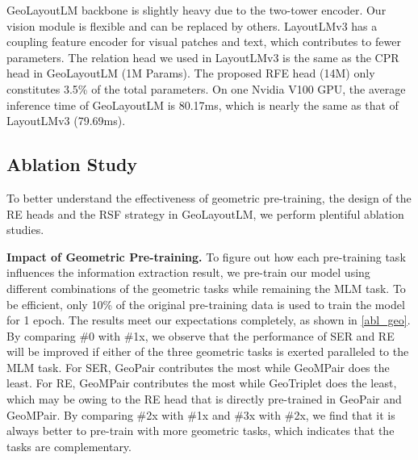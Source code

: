 \documentclass[10pt,twocolumn,letterpaper]{article}
\begin{document}
GeoLayoutLM backbone is slightly heavy due to the two-tower encoder.
Our vision module is flexible and can be replaced by others.
LayoutLMv3 has a coupling feature encoder for visual patches and text, which contributes to fewer parameters.
The relation head we used in LayoutLMv3 is the same as the CPR head in GeoLayoutLM (1M Params).
The proposed RFE head (14M) only constitutes 3.5\% of the total parameters.
On one Nvidia V100 GPU, the average inference time of GeoLayoutLM is 80.17ms, which is nearly the same as that of LayoutLMv3 (79.69ms).

\subsection{Ablation Study}
To better understand the effectiveness of geometric pre-training, the design of the RE heads and the RSF strategy in GeoLayoutLM, we perform plentiful ablation studies.


\noindent \textbf{Impact of Geometric Pre-training.}
To figure out how each pre-training task influences the information extraction result, we pre-train our model using different combinations of the geometric tasks while remaining the MLM task. To be efficient, only 10\% of the original pre-training data is used to train the model for 1 epoch.
The results meet our expectations completely, as shown in \cref{abl_geo}. By comparing \#0 with \#1x, we observe that the performance of SER and RE will be improved if either of the three geometric tasks is exerted paralleled to the MLM task. For SER, GeoPair contributes the most while GeoMPair does the least. For RE, GeoMPair contributes the most while GeoTriplet does the least, which may be owing to the RE head that is directly pre-trained in GeoPair and GeoMPair. By comparing \#2x with \#1x and \#3x with \#2x, we find that it is always better to pre-train with more geometric tasks, which indicates that the tasks are complementary.
\end{document}
